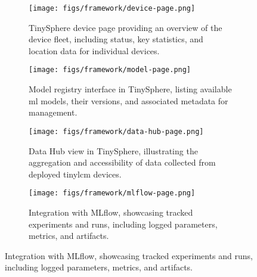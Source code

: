 \begin{figure}[htbp]
    \centering %

    \begin{subfigure}[b]{0.48\textwidth} %
        \centering
        \texttt{[image: figs/framework/device-page.png]} %
        \caption{TinySphere device page providing an overview of the device fleet, including status, key statistics, and location data for individual devices.}
        \label{fig:ui_device_page} %
    \end{subfigure}
    \hfill %
    \begin{subfigure}[b]{0.48\textwidth}
        \centering
        \texttt{[image: figs/framework/model-page.png]} %
        \caption{Model registry interface in TinySphere, listing available \gls{ml} models, their versions, and associated metadata for management.}
        \label{fig:ui_model_registry} %
    \end{subfigure}

    \vspace{1em} %

    \begin{subfigure}[b]{0.48\textwidth}
        \centering
        \texttt{[image: figs/framework/data-hub-page.png]} %
        \caption{Data Hub view in TinySphere, illustrating the aggregation and accessibility of data collected from deployed \gls{tinylcm} devices.}
        \label{fig:ui_data_hub} %
    \end{subfigure}
    \hfill
    \begin{subfigure}[b]{0.48\textwidth}
        \centering
        \texttt{[image: figs/framework/mlflow-page.png]} %
        \caption{Integration with MLflow, showcasing tracked experiments and runs, including logged parameters, metrics, and artifacts.}
        \label{fig:ui_mlflow_integration} %
    \end{subfigure}

    \vspace{1em} %


\end{figure}
